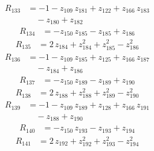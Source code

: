 \begin{equation*}\begin{aligned}
R_{133}&=-1 -z_{109}\,z_{181} +z_{122} +z_{166}\,z_{183} \\
&\quad -z_{180} +z_{182}
\end{aligned}\end{equation*}
\begin{equation*}\begin{aligned}
R_{134}&=-z_{150}\,z_{185} -z_{185} +z_{186}
\end{aligned}\end{equation*}
\begin{equation*}\begin{aligned}
R_{135}&=2\,z_{184} +z_{184}^{2} +z_{185}^{2} -z_{186}^{2}
\end{aligned}\end{equation*}
\begin{equation*}\begin{aligned}
R_{136}&=-1 -z_{109}\,z_{185} +z_{125} +z_{166}\,z_{187} \\
&\quad -z_{184} +z_{186}
\end{aligned}\end{equation*}
\begin{equation*}\begin{aligned}
R_{137}&=-z_{150}\,z_{189} -z_{189} +z_{190}
\end{aligned}\end{equation*}
\begin{equation*}\begin{aligned}
R_{138}&=2\,z_{188} +z_{188}^{2} +z_{189}^{2} -z_{190}^{2}
\end{aligned}\end{equation*}
\begin{equation*}\begin{aligned}
R_{139}&=-1 -z_{109}\,z_{189} +z_{128} +z_{166}\,z_{191} \\
&\quad -z_{188} +z_{190}
\end{aligned}\end{equation*}
\begin{equation*}\begin{aligned}
R_{140}&=-z_{150}\,z_{193} -z_{193} +z_{194}
\end{aligned}\end{equation*}
\begin{equation*}\begin{aligned}
R_{141}&=2\,z_{192} +z_{192}^{2} +z_{193}^{2} -z_{194}^{2}
\end{aligned}\end{equation*}
